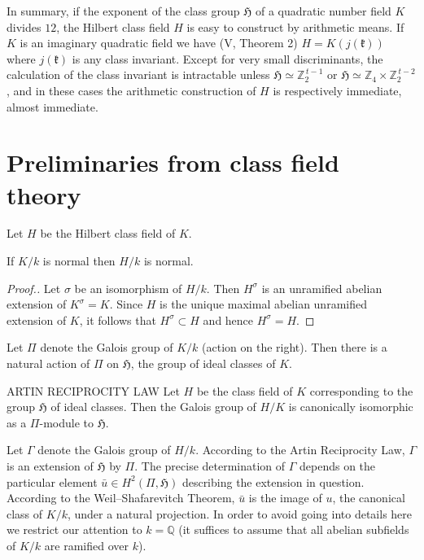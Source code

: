 In summary, if the exponent of the class group $\mathfrak{H}$ of a
quadratic number field $K$ divides $12$, the Hilbert class field $H$ is
easy to construct by arithmetic means. If $K$ is an imaginary quadratic
field we have (V, Theorem 2) $H=K(j(\mathfrak{k}))$ where
$j(\mathfrak{k})$ is any class invariant. Except for very small
discriminants, the calculation of the class invariant is intractable
unless $\mathfrak{H}\simeq\mathbb{Z}_{2}^{\,t-1}$ or
$\mathfrak{H}\simeq\mathbb{Z}_{4}\times\mathbb{Z}_{2}^{\,t-2}$, and in
these cases the arithmetic construction of $H$ is respectively immediate,
almost immediate.

\section{Preliminaries from class field theory}\label{sec:VII-prelim}

Let $H$ be the Hilbert class field of $K$.

\begin{lemma}\label{lem:VII-1}
If $K/k$ is normal then $H/k$ is normal.
\end{lemma}

\begin{proof}[Proof.]
Let $\sigma$ be an isomorphism of $H/k$. Then $H^{\sigma}$ is an
unramified abelian extension of $K^{\sigma}=K$. Since $H$ is the unique
maximal abelian unramified extension of $K$, it follows that
$H^{\sigma}\subset H$ and hence $H^{\sigma}=H$.
\end{proof}

Let $\Pi$ denote the Galois group of $K/k$ (action on the right). Then
there is a natural action of $\Pi$ on $\mathfrak{H}$, the group of ideal
classes of $K$.

\begin{namedstmt}{ARTIN RECIPROCITY LAW}
Let $H$ be the class field of $K$ corresponding to the group
$\mathfrak{H}$ of ideal classes. Then the Galois group of $H/K$ is
canonically isomorphic as a $\Pi$-module to $\mathfrak{H}$.
\end{namedstmt}

Let $\Gamma$ denote the Galois group of $H/k$. According to the Artin
Reciprocity Law, $\Gamma$ is an extension of $\mathfrak{H}$ by $\Pi$. The
precise determination of $\Gamma$ depends on the particular element
$\bar{u}\in H^{2}(\Pi,\mathfrak{H})$ describing the extension in question.
According to the Weil--Shafarevitch Theorem, $\bar{u}$ is the image of
$u$, the canonical class of $K/k$, under a natural projection. In order
to avoid going into details here we restrict our attention to
$k=\mathbb{Q}$ (it suffices to assume that all abelian subfields of
$K/k$ are ramified over $k$).

